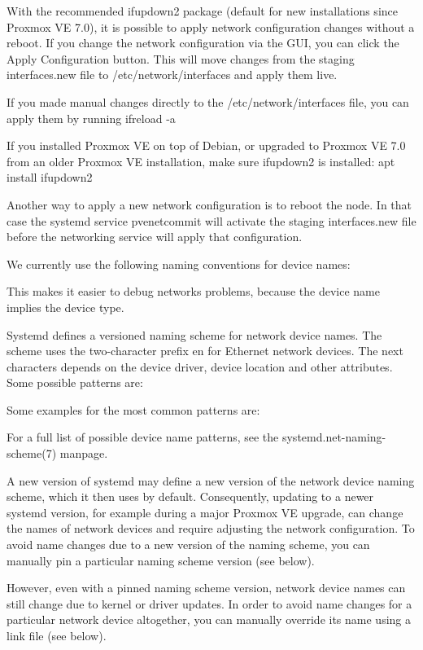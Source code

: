 With the recommended ifupdown2 package (default for new installations since Proxmox VE 7.0), it is possible to apply network configuration changes without a reboot. If you change the network configuration via the GUI, you can click the Apply Configuration button. This will move changes from the staging interfaces.new file to /etc/network/interfaces and apply them live.

If you made manual changes directly to the /etc/network/interfaces file, you can apply them by running ifreload -a

If you installed Proxmox VE on top of Debian, or upgraded to Proxmox VE 7.0 from an older Proxmox VE installation, make sure ifupdown2 is installed: apt install ifupdown2

Another way to apply a new network configuration is to reboot the node. In that case the systemd service pvenetcommit will activate the staging interfaces.new file before the networking service will apply that configuration.

We currently use the following naming conventions for device names:

This makes it easier to debug networks problems, because the device name implies the device type.

Systemd defines a versioned naming scheme for network device names. The scheme uses the two-character prefix en for Ethernet network devices. The next characters depends on the device driver, device location and other attributes. Some possible patterns are:

Some examples for the most common patterns are:

For a full list of possible device name patterns, see the systemd.net-naming-scheme(7) manpage.

A new version of systemd may define a new version of the network device naming scheme, which it then uses by default. Consequently, updating to a newer systemd version, for example during a major Proxmox VE upgrade, can change the names of network devices and require adjusting the network configuration. To avoid name changes due to a new version of the naming scheme, you can manually pin a particular naming scheme version (see below).

However, even with a pinned naming scheme version, network device names can still change due to kernel or driver updates. In order to avoid name changes for a particular network device altogether, you can manually override its name using a link file (see below).

